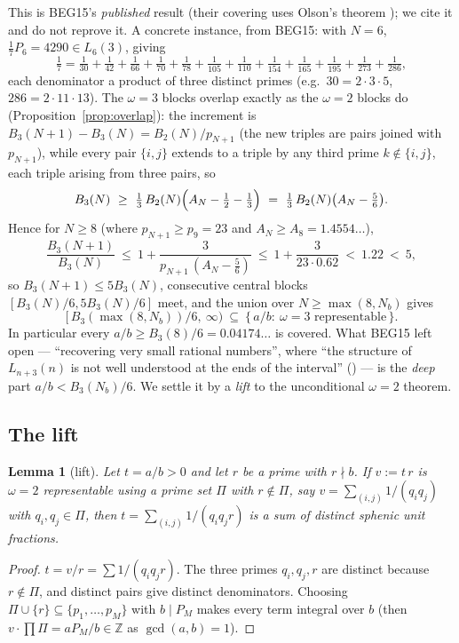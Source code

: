\documentclass[11pt]{amsart}
\theoremstyle{plain}
\newtheorem{lemma}[theorem]{Lemma}
\theoremstyle{definition}
\newcommand{\Z}{\mathbb{Z}}
\begin{document}
This is BEG15's \emph{published} result (their covering uses Olson's theorem
\cite{Olson1968}); we cite it and do not reprove it.
A concrete instance, from BEG15: with $N=6$, $\tfrac17 P_6=4290\in L_6(3)$, giving
\[
  \tfrac17=\tfrac1{30}+\tfrac1{42}+\tfrac1{66}+\tfrac1{70}+\tfrac1{78}+\tfrac1{105}
  +\tfrac1{110}+\tfrac1{154}+\tfrac1{165}+\tfrac1{195}+\tfrac1{273}+\tfrac1{286},
\]
each denominator a product of three distinct primes (e.g.\ $30=2\cdot3\cdot5$,
$286=2\cdot11\cdot13$).
The $\omega=3$ blocks overlap exactly as the $\omega=2$ blocks do
(Proposition~\ref{prop:overlap}): the increment is
$B_3(N{+}1)-B_3(N)=B_2(N)/p_{N+1}$ (the new triples are pairs joined with
$p_{N+1}$), while every pair $\{i,j\}$ extends to a triple by any third prime
$k\notin\{i,j\}$, each triple arising from three pairs, so
\[
  B_3(N)\ \ge\ \tfrac13\,B_2(N)\Bigl(A_N-\tfrac12-\tfrac13\Bigr)
  \ =\ \tfrac13\,B_2(N)\bigl(A_N-\tfrac56\bigr).
\]
Hence for $N\ge8$ (where $p_{N+1}\ge p_9=23$ and $A_N\ge A_8=1.4554\ldots$),
\[
  \frac{B_3(N{+}1)}{B_3(N)}\ \le\ 1+\frac{3}{p_{N+1}\,(A_N-\tfrac56)}
  \ \le\ 1+\frac{3}{23\cdot 0.62}\ <\ 1.22\ <\ 5 ,
\]
so $B_3(N{+}1)\le5B_3(N)$, consecutive central blocks
$[B_3(N)/6,5B_3(N)/6]$ meet, and the union over $N\ge\max(8,N_b)$ gives
\begin{equation}\label{eq:centralcover}
  \bigl[\,B_3(\max(8,N_b))/6,\ \infty\bigr)\ \subseteq\ \{\,a/b:\ \omega=3\text{ representable}\,\}.
\end{equation}
In particular every $a/b\ge B_3(8)/6=0.04174\ldots$ is covered.  What BEG15 left
open --- ``recovering very small rational numbers'', where ``the structure of
$L_{n+3}(n)$ is not well understood at the ends of the interval'' (\cite{BEG2015})
--- is the \emph{deep} part $a/b<B_3(N_b)/6$.  We settle it by a \emph{lift} to the
unconditional $\omega=2$ theorem.

\subsection{The lift}
\begin{lemma}[lift]\label{lem:lift}
Let $t=a/b>0$ and let $r$ be a prime with $r\nmid b$.  If $v:=t\,r$ is $\omega=2$
representable using a prime set $\Pi$ with $r\notin\Pi$, say
$v=\sum_{(i,j)}1/(q_iq_j)$ with $q_i,q_j\in\Pi$, then
$t=\sum_{(i,j)}1/(q_iq_jr)$ is a sum of distinct sphenic unit fractions.
\end{lemma}
\begin{proof}
$t=v/r=\sum 1/(q_iq_jr)$.  The three primes $q_i,q_j,r$ are distinct because
$r\notin\Pi$, and distinct pairs give distinct denominators.  Choosing
$\Pi\cup\{r\}\subseteq\{p_1,\dots,p_M\}$ with $b\mid P_M$ makes every term integral
over $b$ (then $v\cdot\!\prod\Pi=a P_M/b\in\Z$ as $\gcd(a,b)=1$).
\end{proof}
\end{document}
